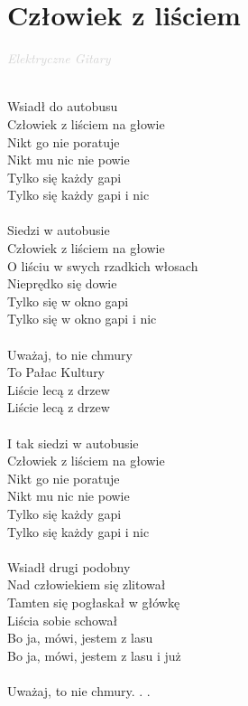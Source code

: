 \documentclass[a5paper, 10pt]{book}
\begin{document}
\section{Człowiek z liściem}\textcolor{lightgray}{\textit{Elektryczne Gitary}}\\~\\
\begin{minipage}[t]{0.5\textwidth}
  Wsiadł do autobusu\\
  Człowiek z liściem na głowie\\
  Nikt go nie poratuje\\
  Nikt mu nic nie powie\\
  Tylko się każdy gapi\\
  Tylko się każdy gapi i nic\\
  \\
  Siedzi w autobusie\\
  Człowiek z liściem na głowie\\
  O liściu w swych rzadkich włosach\\
  Nieprędko się dowie\\
  Tylko się w okno gapi\\
  Tylko się w okno gapi i nic\\
  \\
  \hspace*{5mm}Uważaj, to nie chmury\\
  \hspace*{5mm}To Pałac Kultury\\
  \hspace*{5mm}Liście lecą z drzew\\
  \hspace*{5mm}Liście lecą z drzew\\
  \\
  I tak siedzi w autobusie\\
  Człowiek z liściem na głowie\\
  Nikt go nie poratuje\\
  Nikt mu nic nie powie\\
  Tylko się każdy gapi\\
  Tylko się każdy gapi i nic\\
  \\
  Wsiadł drugi podobny\\
  Nad człowiekiem się zlitował\\
  Tamten się pogłaskał w główkę\\
  Liścia sobie schował\\
  Bo ja, mówi, jestem z lasu\\
  Bo ja, mówi, jestem z lasu i już\\
  \\
  \hspace*{5mm}Uważaj, to nie chmury. . .\\
\end{minipage}
\end{document}
